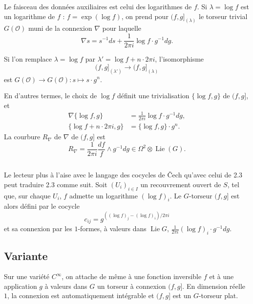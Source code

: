 \documentclass[12pt,a4paper]{article}
\theoremstyle{plain}
\theoremstyle{definition}
\theoremstyle{remark}
\newcommand{\cO}{\mathcal{O}}
\providecommand{\cO}{\mathcal{O}}
\begin{document}
Le faisceau des données auxiliaires est celui des logarithmes de $f$. Si $\lambda = \log f$
est un logarithme de $f$ : $f = \exp(\log f)$, on prend pour $(f,g]_{(\lambda)}$ le torseur trivial $G(\cO)$
muni de la connexion $\nabla$ pour laquelle
\[
\nabla s = s^{-1}ds + \frac{1}{2\pi i} \log f \cdot g^{-1}dg.
\]

Si l'on remplace $\lambda = \log f$ par $\lambda' = \log f + n \cdot 2\pi i$, l'isomorphisme
\[
(f,g]_{(\lambda')} \to (f,g]_{(\lambda)}
\]
est $G(\cO) \to G(\cO) : s \mapsto s \cdot g^n$.

En d'autres termes, le choix de $\log f$ définit une trivialisation $\{\log f, g\}$ de $(f,g]$, et
\begin{align}
\nabla\{\log f, g\} &= \frac{1}{2\pi i} \log f \cdot g^{-1}dg, \label{eq:2.3.1} \\
\{\log f + n \cdot 2\pi i, g\} &= \{\log f, g\} \cdot g^n. \label{eq:2.3.2}
\end{align}
La courbure $R_{\nabla}$ de $\nabla$ de $(f,g]$ est
\begin{equation}\label{eq:2.3.3}
R_{\nabla} = \frac{1}{2\pi i} \frac{df}{f} \wedge g^{-1}dg \in \Omega^2 \otimes \operatorname{Lie}(G).
\end{equation}

\subsection{}

Le lecteur plus à l'aise avec le langage des cocycles de Čech qu'avec celui
de 2.3 peut traduire 2.3 comme suit. Soit $(U_i)_{i \in I}$ un recouvrement ouvert de $S$, tel
que, sur chaque $U_i$, $f$ admette un logarithme $(\log f)_i$. Le $G$-torseur $(f,g]$ est alors
défini par le cocycle
\[
c_{ij} = g^{((\log f)_j - (\log f)_i)/2\pi i}
\]
et sa connexion par les $1$-formes, à valeurs dans $\operatorname{Lie} G$, $\frac{1}{2\pi i} (\log f)_i \cdot g^{-1}dg$.

\subsection{Variante}

Sur une variété $C^\infty$, on attache de même à une fonction inversible $f$
et à une application $g$ à valeurs dans $G$ un torseur à connexion $(f,g]$. En dimension
réelle $1$, la connexion est automatiquement intégrable et $(f,g]$ est un $G$-torseur plat.

\subsection{}
\end{document}
